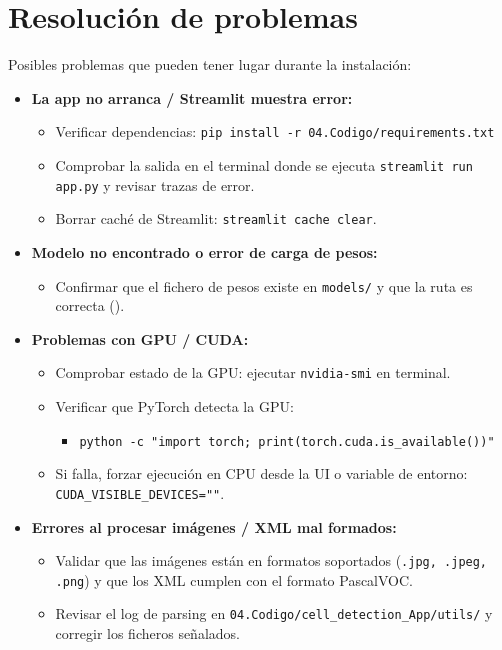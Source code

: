 \documentclass[12pt,a4paper,onecolumn,oneside]{report}
\begin{document}
\section{Resolución de problemas}
\label{sec:Resolución de problemas}
Posibles problemas que pueden tener lugar durante la instalación:

\begin{itemize}
  \item \textbf{La app no arranca / Streamlit muestra error:}
    \begin{itemize}
      \item Verificar dependencias: \texttt{pip install -r 04.Codigo/requirements.txt}
      \item Comprobar la salida en el terminal donde se ejecuta \texttt{streamlit run app.py} y revisar trazas de error.
      \item Borrar caché de Streamlit: \texttt{streamlit cache clear}.
    \end{itemize}
  \item \textbf{Modelo no encontrado o error de carga de pesos:}
    \begin{itemize}
      \item Confirmar que el fichero de pesos existe en \texttt{models/} y que la ruta es correcta ().
    \end{itemize}
  \item \textbf{Problemas con GPU / CUDA:}
    \begin{itemize}
      \item Comprobar estado de la GPU: ejecutar \texttt{nvidia-smi} en terminal.
      \item Verificar que PyTorch detecta la GPU: 
        \begin{itemize}
          \item \texttt{python -c "import torch; print(torch.cuda.is\_available())"}
        \end{itemize}
      \item Si falla, forzar ejecución en CPU desde la UI o variable de entorno: \texttt{CUDA\_VISIBLE\_DEVICES=""}.
    \end{itemize}
  \item \textbf{Errores al procesar imágenes / XML mal formados:}
    \begin{itemize}
      \item Validar que las imágenes están en formatos soportados (\texttt{.jpg, .jpeg, .png}) y que los XML cumplen con el formato PascalVOC.
      \item Revisar el log de parsing en \texttt{04.Codigo/cell\_detection\_App/utils/} y corregir los ficheros señalados.
    \end{itemize}
\end{itemize}
\end{document}
